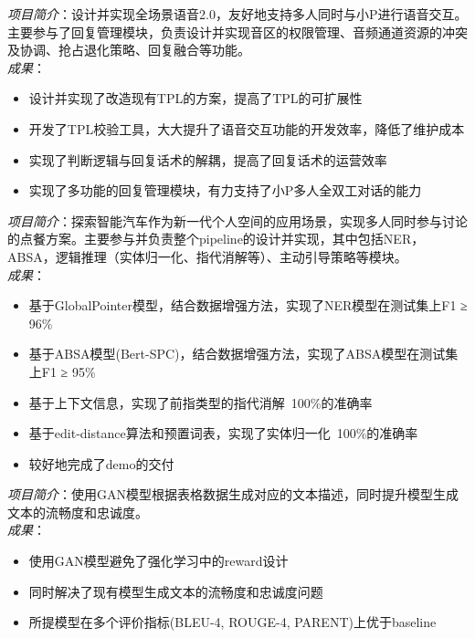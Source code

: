 \documentclass{resume}
\begin{document}
\begin{onehalfspacing}
\emph{项目简介}：设计并实现全场景语音2.0，友好地支持多人同时与小P进行语音交互。主要参与了回复管理模块，负责设计并实现音区的权限管理、音频通道资源的冲突及协调、抢占退化策略、回复融合等功能。
\\
\emph{成果}：
\begin{itemize}
  \item 设计并实现了改造现有TPL的方案，提高了TPL的可扩展性
  \item 开发了TPL校验工具，大大提升了语音交互功能的开发效率，降低了维护成本
  \item 实现了判断逻辑与回复话术的解耦，提高了回复话术的运营效率 
  \item 实现了多功能的回复管理模块，有力支持了小P多人全双工对话的能力
\end{itemize}
\end{onehalfspacing}


\begin{onehalfspacing}
\emph{项目简介}：探索智能汽车作为新一代个人空间的应用场景，实现多人同时参与讨论的点餐方案。主要参与并负责整个pipeline的设计并实现，其中包括NER，ABSA，逻辑推理（实体归一化、指代消解等）、主动引导策略等模块。
\\
\emph{成果}：
\begin{itemize}
  \item 基于GlobalPointer模型，结合数据增强方法，实现了NER模型在测试集上F1 ≥ 96\%
  \item 基于ABSA模型(Bert-SPC)，结合数据增强方法，实现了ABSA模型在测试集上F1 ≥ 95\%
  \item 基于上下文信息，实现了前指类型的指代消解~100\%的准确率
  \item 基于edit-distance算法和预置词表，实现了实体归一化~100\%的准确率
  \item 较好地完成了demo的交付
\end{itemize}
\end{onehalfspacing}

\begin{onehalfspacing}
\emph{项目简介}：使用GAN模型根据表格数据生成对应的文本描述，同时提升模型生成文本的流畅度和忠诚度。\\
\emph{成果}：
\begin{itemize}
  \item 使用GAN模型避免了强化学习中的reward设计
  \item 同时解决了现有模型生成文本的流畅度和忠诚度问题
  \item 所提模型在多个评价指标(BLEU-4, ROUGE-4, PARENT)上优于baseline
\end{itemize}
\end{onehalfspacing}
\end{document}
